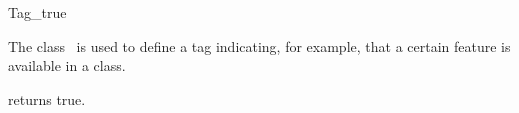 \begin{ccRefClass}{Tag_true}

\ccDefinition

The class \ccRefName\ is used to define a tag indicating, for example,
that a certain feature is available in a class.


{returns true.}

\ccSeeAlso
{} \\

\end{ccRefClass}
